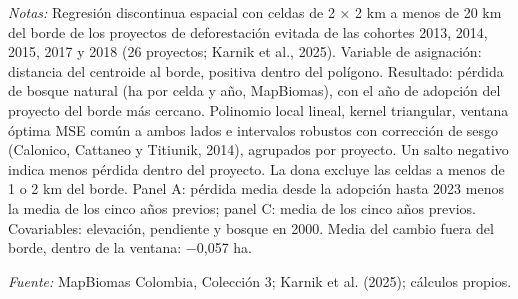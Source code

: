 \begin{table}[htbp]
\begin{threeparttable}
\begin{tabular}{@{}lccccc@{}}
\bottomrule
\end{tabular}
\begin{tablenotes}[flushleft]
\footnotesize
\item \textit{Notas:} Regresión discontinua espacial con celdas de 2 × 2 km a menos de 20 km del borde de los proyectos de deforestación evitada de las cohortes 2013, 2014, 2015, 2017 y 2018 (26 proyectos; Karnik et al., 2025). Variable de asignación: distancia del centroide al borde, positiva dentro del polígono. Resultado: pérdida de bosque natural (ha por celda y año, MapBiomas), con el año de adopción del proyecto del borde más cercano. Polinomio local lineal, kernel triangular, ventana óptima MSE común a ambos lados e intervalos robustos con corrección de sesgo (Calonico, Cattaneo y Titiunik, 2014), agrupados por proyecto. Un salto negativo indica menos pérdida dentro del proyecto. La dona excluye las celdas a menos de 1 o 2 km del borde. Panel A: pérdida media desde la adopción hasta 2023 menos la media de los cinco años previos; panel C: media de los cinco años previos. Covariables: elevación, pendiente y bosque en 2000. Media del cambio fuera del borde, dentro de la ventana: $-$0,057 ha.
\item \textit{Fuente:} MapBiomas Colombia, Colección 3; Karnik et al. (2025); cálculos propios.
\end{tablenotes}
\end{threeparttable}
\end{table}
